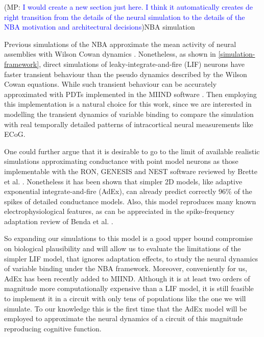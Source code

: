 \documentclass[10pt]{article}
\newcommand{\noteMP}[3]{(MP: \textcolor{blue}{#1})}
\begin{document}
{\noteMP{I would create a new section just here. I think it automatically creates de right transition from the details of the neural simulation to the details of the NBA motivation and architectural decisions}.


\subsection{NBA simulation}\label{architectural-decisions}

Previous simulations of the NBA approximate the mean activity of neural assemblies with Wilson Cowan dynamics \cite{Frank_2014}.
Nonetheless, as shown in \ref{simulation-framework}, direct simulations of leaky-integrate-and-fire (LIF) neurons \cite{omurtag2000simulation} have faster transient behaviour than the pseudo dynamics described by the Wilson Cowan equations.
While such transient behaviour can be accurately approximated with PDTs \cite{de2013generic} implemented in the MIIND software \cite{de_Kamps_2008}. 
Then employing this implementation is a natural choice for this work, since we are interested in modelling the transient dynamics of variable binding to compare the simulation with real temporally detailed patterns of intracortical neural measurements like ECoG.

One could further argue that it is desirable to go to the limit of available realistic simulations approximating conductance with point model neurons as those implementable with the RON, GENESIS and NEST software reviewed by Brette et al. \cite{brette2007simulation}.
Nonetheless it has been shown that simpler 2D models, like adaptive exponential integrate-and-fire (AdEx), can already predict correctly 96\% of the spikes of detailed conductance models\cite{brette2005adaptive}.
Also, this model reproduces many known electrophysiological features, as can be appreciated in the spike-frequency adaptation review of Benda et al. \cite{Benda_2003,Benda_2014}.

So expanding our simulations to this model is a good upper bound compromise on biological plausibility and will allow us to evaluate the limitations of the simpler LIF model, that ignores adaptation effects, to study the neural dynamics of variable binding under the NBA framework.
Moreover, conveniently for us, AdEx has been recently added to MIIND. Although it is at least two orders of magnitude more computationally expensive than a LIF model, it is still feasible to implement it in a circuit with only tens of populations like the one we will simulate.
To our knowledge this is the first time that the AdEx model will be employed to approximate the neural dynamics of a circuit of this magnitude reproducing cognitive function.

}
\end{document}
